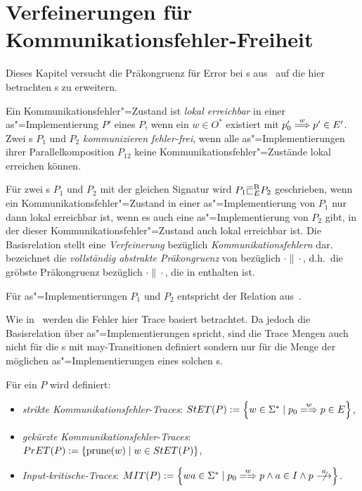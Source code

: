 \chapter{Verfeinerungen für Kommunikationsfehler-Freiheit}

Dieses Kapitel versucht die Präkongruenz für Error bei \EIO{}s
aus~\cite{Schinko2016BA} auf die hier betrachten \MEIO{}s zu erweitern.

\begin{Def}
  Ein Kommunikationsfehler"=Zustand ist \emph{lokal erreichbar} in einer
  as"=Implementierung $P'$ eines \MEIO{} $P$, wenn ein $w\in O^*$ existiert mit
  $p'_0 \weakmust[w]p'\in E'$.\\
  Zwei \MEIO{}s $P_1$ und $P_2$ \emph{kommunizieren fehler-frei}, wenn alle
  as"=Implementierungen ihrer Parallelkomposition $P_{12}$ keine
  Kommunikationsfehler"=Zustände lokal erreichen können.
\end{Def}

\begin{Def}
  Für zwei \MEIO{}s $P_1$ und $P_2$ mit der gleichen Signatur wird $P_1\EBRel{} P_2$
  geschrieben, wenn ein Kommunikationsfehler"=Zustand in einer as"=Implementierung
  von $P_1$ nur dann lokal erreichbar ist, wenn es auch eine as"=Implementierung
  von $P_2$ gibt, in der dieser Kommunikationsfehler"=Zustand auch lokal
  erreichbar ist. Die Basisrelation stellt eine \emph{Verfeinerung} bezüglich
  \emph{Kommunikationsfehlern} dar.\\
  \ECRel{} bezeichnet die \emph{vollständig abstrakte Präkongruenz} von
  \EBRel{} bezüglich $\cdot\|\cdot$, d.h.\ die gröbste Präkongruenz bezüglich
  $\cdot\|\cdot$, die in \EBRel{} enthalten ist.
\end{Def}

Für as"=Implementierungen $P_1$ und $P_2$ entspricht \EBRel{} der Relation
\EBbaRel{} aus~\cite{Schinko2016BA}.

Wie in~\cite{Schinko2016BA} werden die Fehler hier Trace basiert betrachtet. Da
jedoch die Basisrelation über as"=Implementierungen spricht, sind die Trace Mengen
auch nicht für die \MEIO{}s mit may-Transitionen definiert sondern nur für die
Menge der möglichen as"=Implementierungen eines solchen \MEIO{}s.

\begin{Def}
  Für ein \MEIO{} $P$ wird definiert:
  \begin{itemize}
    \item \emph{strikte Kommunikationsfehler-Traces}: $\StET (P) :=
      \left\{w\in\Sigma ^* \mid p_0 \weakmay[w] p \in E\right\}$,
    \item \emph{gekürzte Kommunikationsfehler-Traces}: $PrET (P) :=
      \left\{\mathrm{prune} (w) \mid w\in StET (P)\right\}$,
    \item \emph{Input-kritische-Traces}: $\MIT (P) := \left\{wa\in\Sigma ^*
      \mid p_0 \weakmay[w] p \land a\in I\land p\nmust[a] \right\}$.
  \end{itemize}
\end{Def}


